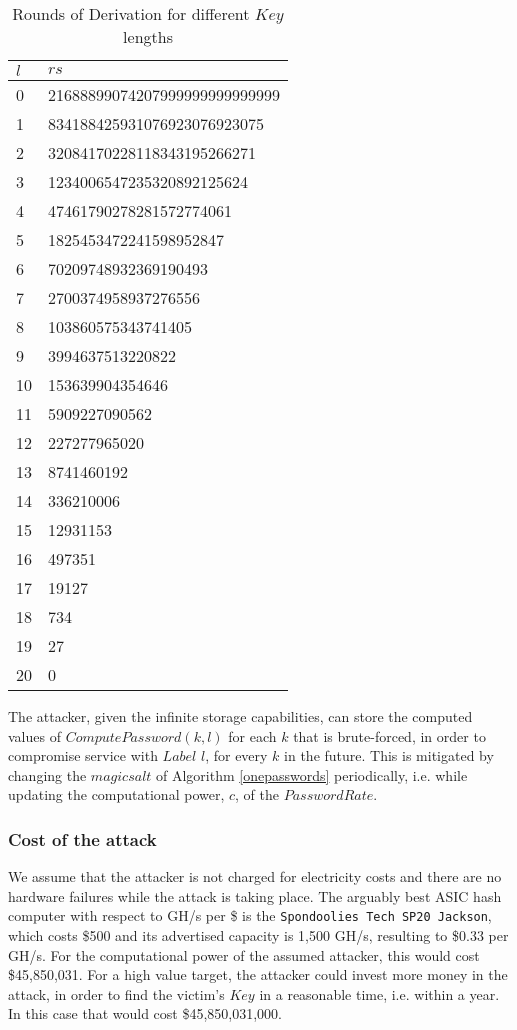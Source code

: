 \documentclass{sig-alternate}
\begin{document}
\begin{table}[H]
\label{table:rounds}
\centering
\caption{Rounds of Derivation for different $Key$ lengths}
\begin{tabular}{ |l|l| }
  \hline
  $l$ & $rs$ \\
  \hline
  0  & 21688899074207999999999999999\\
  1  & 834188425931076923076923075\\
  2  & 32084170228118343195266271\\
  3  & 1234006547235320892125624\\
  4  & 47461790278281572774061\\
  5  & 1825453472241598952847\\
  6  & 70209748932369190493\\
  7  & 2700374958937276556\\
  8  & 103860575343741405\\
  9  & 3994637513220822\\
  10 & 153639904354646\\
  11 & 5909227090562\\
  12 & 227277965020\\
  13 & 8741460192\\
  14 & 336210006\\
  15 & 12931153\\
  16 & 497351\\
  17 & 19127\\
  18 & 734\\
  19 & 27\\
  20 & 0\\
  \hline
\end{tabular}
\end{table}

The attacker, given the infinite storage capabilities, can store the computed
values of $ComputePassword(k, l)$ for each $k$ that is brute-forced, in order to
compromise service with $Label$ $l$, for every $k$ in the future.
This is mitigated by changing the $magic salt$ of Algorithm \ref{onepasswords} periodically,
i.e. while updating the computational power, $c$, of the $Password Rate$.

\subsubsection{Cost of the attack}

We assume that the attacker is not charged for electricity costs and there are no hardware
failures while the attack is taking place. The arguably best ASIC hash computer
with respect to GH/s per \$ is the \texttt{Spondoolies Tech SP20 Jackson},
which costs \$500 and its advertised capacity is 1,500 GH/s, resulting to \$0.33 per GH/s.
For the computational power of the assumed attacker, this would cost \$45,850,031.
For a high value target, the attacker could invest more money in the attack, in order
to find the victim's $Key$ in a reasonable time, i.e. within a year.
In this case that would cost \$45,850,031,000.
\end{document}
